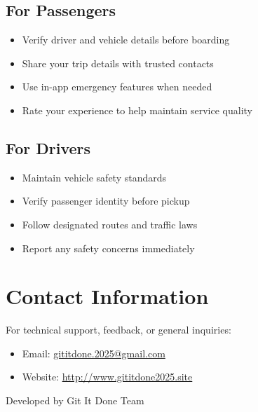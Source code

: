\documentclass[12pt]{article}
\begin{document}
\subsection{For Passengers}
\begin{itemize}
    \item Verify driver and vehicle details before boarding
    \item Share your trip details with trusted contacts
    \item Use in-app emergency features when needed
    \item Rate your experience to help maintain service quality
\end{itemize}

\subsection{For Drivers}
\begin{itemize}
    \item Maintain vehicle safety standards
    \item Verify passenger identity before pickup
    \item Follow designated routes and traffic laws
    \item Report any safety concerns immediately
\end{itemize}

\section{Contact Information}

For technical support, feedback, or general inquiries:
\begin{itemize}
    \item Email: \href{mailto:gititdone.2025@gmail.com}{gititdone.2025@gmail.com}\\
    \item Website: \url{http://www.gititdone2025.site}
\end{itemize}

Developed by Git It Done Team
\end{document}
